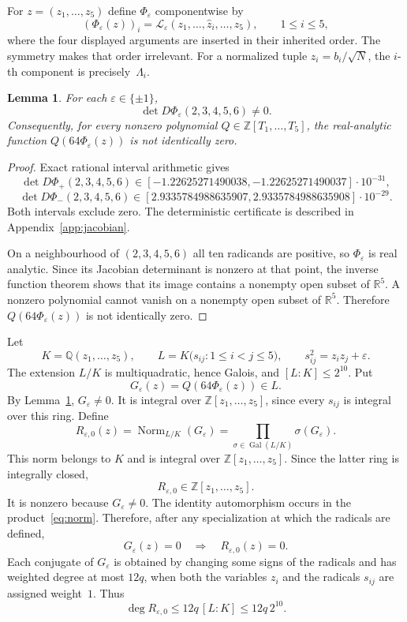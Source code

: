 \documentclass[11pt]{amsart}
\newtheorem{lemma}[theorem]{Lemma}
\theoremstyle{remark}
\newcommand{\Z}{\mathbb Z}
\newcommand{\Q}{\mathbb Q}
\newcommand{\eps}{\varepsilon}
\begin{document}
For $z=(z_1,\ldots,z_5)$ define $\Phi_\eps$ componentwise by
\begin{equation}
 (\Phi_\eps(z))_i=
 \mathcal L_\eps(z_1,\ldots,\widehat z_i,\ldots,z_5),
 \qquad 1\le i\le5,
\end{equation}
where the four displayed arguments are inserted in their inherited order.
The symmetry makes that order irrelevant. For a normalized tuple
$z_i=b_i/\sqrt N$, the $i$-th component is precisely~$\Lambda_i$.

\begin{lemma}%
\label{lem:jacobian}
For each $\eps\in\{\pm1\}$,
\[
 \det D\Phi_\eps(2,3,4,5,6)\ne0.
\]
Consequently, for every nonzero polynomial $Q\in\Z[T_1,\ldots,T_5]$,
the real-analytic function $Q(64\Phi_\eps(z))$ is not identically zero.
\end{lemma}

\begin{proof}
Exact rational interval arithmetic gives
\[
 \det D\Phi_{+}(2,3,4,5,6)
 \in[-1.22625271490038,-1.22625271490037]\cdot10^{-31},
\]
\[
 \det D\Phi_{-}(2,3,4,5,6)
 \in[2.9335784988635907,2.9335784988635908]\cdot10^{-29}.
\]
Both intervals exclude zero. The deterministic certificate is described in
Appendix~\ref{app:jacobian}.

On a neighbourhood of $(2,3,4,5,6)$ all ten radicands are positive, so
$\Phi_\eps$ is real analytic. Since its Jacobian determinant is nonzero at
that point, the inverse function theorem shows that its image contains a
nonempty open subset of $\mathbb R^5$. A nonzero polynomial cannot vanish on
a nonempty open subset of $\mathbb R^5$. Therefore
$Q(64\Phi_\eps(z))$ is not identically zero.
\end{proof}

Let
\[
 K=\Q(z_1,\ldots,z_5),\qquad
 L=K\bigl(s_{ij}:1\le i<j\le5\bigr),
 \qquad s_{ij}^2=z_iz_j+\eps.
\]
The extension $L/K$ is multiquadratic, hence Galois, and
$[L:K]\le2^{10}$. Put
\[
 G_\eps(z)=Q(64\Phi_\eps(z))\in L.
\]
By Lemma~\ref{lem:jacobian}, $G_\eps\ne0$. It is integral over
$\Z[z_1,\ldots,z_5]$, since every $s_{ij}$ is integral over this ring.
Define
\begin{equation}\label{eq:norm}
 R_{\eps,0}(z)
 =\operatorname{Norm}_{L/K}(G_\eps)
 =\prod_{\sigma\in\operatorname{Gal}(L/K)}\sigma(G_\eps).
\end{equation}
This norm belongs to $K$ and is integral over
$\Z[z_1,\ldots,z_5]$. Since the latter ring is integrally closed,
\[
 R_{\eps,0}\in\Z[z_1,\ldots,z_5].
\]
It is nonzero because $G_\eps\ne0$. The identity automorphism occurs in the
product~\eqref{eq:norm}. Therefore, after any specialization at which the
radicals are defined,
\begin{equation}\label{eq:R0imp}
 G_\eps(z)=0\quad\Longrightarrow\quad R_{\eps,0}(z)=0.
\end{equation}
Each conjugate of $G_\eps$ is obtained by changing some signs of the radicals
and has weighted degree at most $12q$, when both the variables $z_i$ and the
radicals $s_{ij}$ are assigned weight~$1$. Thus
\begin{equation}
 \deg R_{\eps,0}\le12q\,[L:K]\le12q\,2^{10}.
\end{equation}
\end{document}
